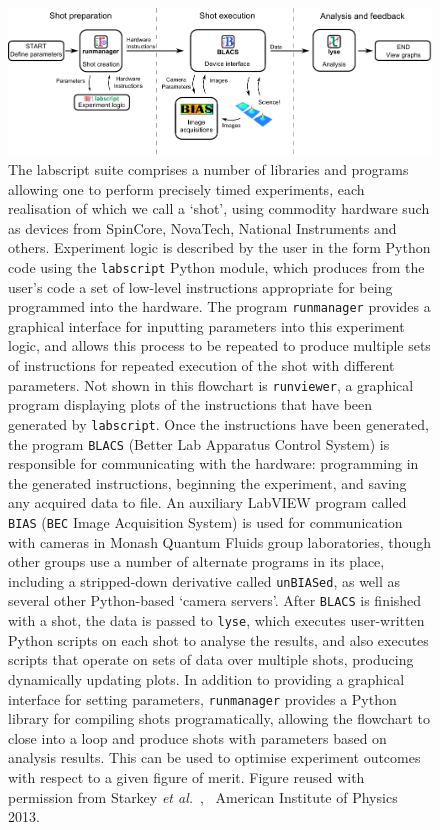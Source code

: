 \begin{figure}
\begin{center}
\includegraphics[width=\textwidth]{figures/software/flow_chart_simple-eps-converted-to.pdf}
\caption{The labscript suite comprises a number of libraries and programs allowing one to perform precisely timed experiments, each realisation of which we call a `shot', using commodity hardware such as devices from SpinCore, NovaTech, National Instruments and others. Experiment logic is described by the user in the form Python code using the \texttt{labscript} Python module, which produces from the user's code a set of low-level instructions appropriate for being programmed into the hardware. The program \texttt{runmanager} provides a graphical interface for inputting parameters into this experiment logic, and allows this process to be repeated to produce multiple sets of instructions for repeated execution of the shot with different parameters. Not shown in this flowchart is \texttt{runviewer}, a graphical program displaying plots of the instructions that have been generated by \texttt{labscript}. Once the instructions have been generated, the program \texttt{BLACS} (Better Lab Apparatus Control System) is responsible for communicating with the hardware: programming in the generated instructions, beginning the experiment, and saving any acquired data to file. An auxiliary LabVIEW program called \texttt{BIAS} (\texttt{BEC} Image Acquisition System) is used for communication with cameras in Monash Quantum Fluids group laboratories, though other groups use a number of alternate programs in its place, including a stripped-down derivative called \texttt{unBIASed}, as well as several other Python-based `camera servers'. After \texttt{BLACS} is finished with a shot, the data is passed to \texttt{lyse}, which executes user-written Python scripts on each shot to analyse the results, and also executes scripts that operate on sets of data over multiple shots, producing dynamically updating plots. In addition to providing a graphical interface for setting parameters, \texttt{runmanager} provides a Python library for compiling shots programatically, allowing the flowchart to close into a loop and produce shots with parameters based on analysis results. This can be used to optimise experiment outcomes with respect to a given figure of merit. Figure reused with permission from Starkey \emph{\emph{et al.}}~\cite{starkey_scripted_2013}, \textcopyright\ American Institute of Physics 2013.}\label{fig:labscript_flowchart}
\end{center}
\end{figure}

